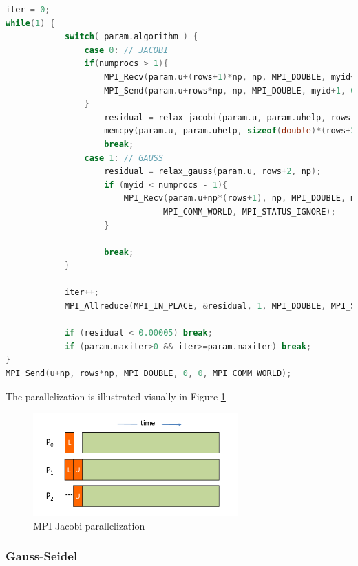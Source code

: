 \documentclass[titlepage]{article}
\begin{document}
\begin{lstlisting}[label=code:mpi_workers,style=c, language=C, caption=MPI Jacobi/Gauss-Seidel convergence for the worker processes, captionpos=b]
iter = 0;
while(1) {
            switch( param.algorithm ) {
                case 0: // JACOBI
                if(numprocs > 1){
                    MPI_Recv(param.u+(rows+1)*np, np, MPI_DOUBLE, myid+1, 0, MPI_COMM_WORLD, MPI_STATUS_IGNORE);
                    MPI_Send(param.u+rows*np, np, MPI_DOUBLE, myid+1, 0, MPI_COMM_WORLD );
                }
                    residual = relax_jacobi(param.u, param.uhelp, rows + 2, np);
                    memcpy(param.u, param.uhelp, sizeof(double)*(rows+2)*np);
                    break;
                case 1: // GAUSS
                    residual = relax_gauss(param.u, rows+2, np);
                    if (myid < numprocs - 1){
                        MPI_Recv(param.u+np*(rows+1), np, MPI_DOUBLE, myid+1, 0, 
                                MPI_COMM_WORLD, MPI_STATUS_IGNORE);
                    }

                    break;
            }

            iter++;
            MPI_Allreduce(MPI_IN_PLACE, &residual, 1, MPI_DOUBLE, MPI_SUM, MPI_COMM_WORLD);

            if (residual < 0.00005) break;
            if (param.maxiter>0 && iter>=param.maxiter) break;
}
MPI_Send(u+np, rows*np, MPI_DOUBLE, 0, 0, MPI_COMM_WORLD);
\end{lstlisting}

The parallelization is illustrated visually in Figure \ref{fig:mpi_jacobi}

\begin{figure}[H]
\centering
\includegraphics[width=0.7\textwidth]{mpi_jacobi.png}
\caption{MPI Jacobi parallelization}
\label{fig:mpi_jacobi}
\end{figure}

\subsubsection{Gauss-Seidel}
\label{sec:mpi_gauss_seidel}
\end{document}
